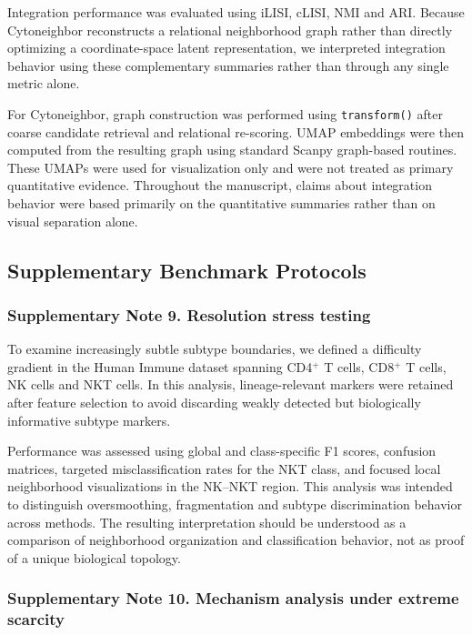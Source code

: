 \documentclass[11pt]{article}
\begin{document}
Integration performance was evaluated using iLISI, cLISI, NMI and ARI. Because Cytoneighbor reconstructs a relational neighborhood graph rather than directly optimizing a coordinate-space latent representation, we interpreted integration behavior using these complementary summaries rather than through any single metric alone.

For Cytoneighbor, graph construction was performed using \texttt{transform()} after coarse candidate retrieval and relational re-scoring. UMAP embeddings were then computed from the resulting graph using standard Scanpy graph-based routines. These UMAPs were used for visualization only and were not treated as primary quantitative evidence. Throughout the manuscript, claims about integration behavior were based primarily on the quantitative summaries rather than on visual separation alone.

\subsection*{Supplementary Benchmark Protocols}

\subsubsection*{Supplementary Note 9. Resolution stress testing}

To examine increasingly subtle subtype boundaries, we defined a difficulty gradient in the Human Immune dataset spanning CD4$^{+}$ T cells, CD8$^{+}$ T cells, NK cells and NKT cells. In this analysis, lineage-relevant markers were retained after feature selection to avoid discarding weakly detected but biologically informative subtype markers.

Performance was assessed using global and class-specific F1 scores, confusion matrices, targeted misclassification rates for the NKT class, and focused local neighborhood visualizations in the NK--NKT region. This analysis was intended to distinguish oversmoothing, fragmentation and subtype discrimination behavior across methods. The resulting interpretation should be understood as a comparison of neighborhood organization and classification behavior, not as proof of a unique biological topology.

\subsubsection*{Supplementary Note 10. Mechanism analysis under extreme scarcity}
\end{document}

